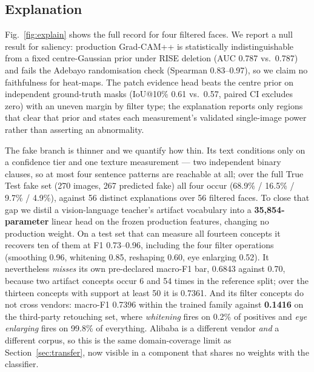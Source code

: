 \documentclass[conference]{IEEEtran}
\begin{document}
\subsection{Explanation}
\label{sec:xai}
Fig.~\ref{fig:explain} shows the full record for four filtered faces. We report a null
result for saliency: production Grad-CAM++ is statistically indistinguishable from a fixed
centre-Gaussian prior under RISE deletion (AUC 0.787 vs.\ 0.787) and fails the Adebayo
randomisation check (Spearman 0.83--0.97), so we claim no faithfulness for heat-maps. The
patch evidence head beats the centre prior on independent ground-truth masks
(IoU@10\% 0.61 vs.\ 0.57, paired CI excludes zero) with an uneven margin by filter type; the
explanation reports only regions that clear that prior and states each measurement's
validated single-image power rather than asserting an abnormality.

The fake branch is thinner and we quantify how thin. Its text conditions only on a confidence
tier and one texture measurement --- two independent binary clauses, so at most four sentence
patterns are reachable at all; over the full True Test fake set (270 images, 267 predicted
fake) all four occur (68.9\% / 16.5\% / 9.7\% / 4.9\%), against 56 distinct explanations over 56
filtered faces. To close that gap we
distil a vision-language teacher's artifact vocabulary into a \textbf{35{,}854-parameter}
linear head on the frozen production features, changing no production weight. On a test set
that can measure all fourteen concepts it recovers ten of them at F1 0.73--0.96, including the
four filter operations (smoothing 0.96, whitening 0.85, reshaping 0.60, eye enlarging 0.52).
It nevertheless \emph{misses} its own pre-declared macro-F1 bar, 0.6843 against 0.70, because
two artifact concepts occur 6 and 54 times in the reference split; over the thirteen concepts
with support at least 50 it is 0.7361. And its filter concepts do not cross vendors: macro-F1
0.7396 within the trained family against \textbf{0.1416} on the third-party retouching set,
where \emph{whitening} fires on 0.2\% of positives and \emph{eye enlarging} fires on 99.8\% of
everything. Alibaba is a different vendor \emph{and} a different corpus, so this is the same
domain-coverage limit as Section~\ref{sec:transfer}, now visible in a component that shares no
weights with the classifier.
\end{document}
